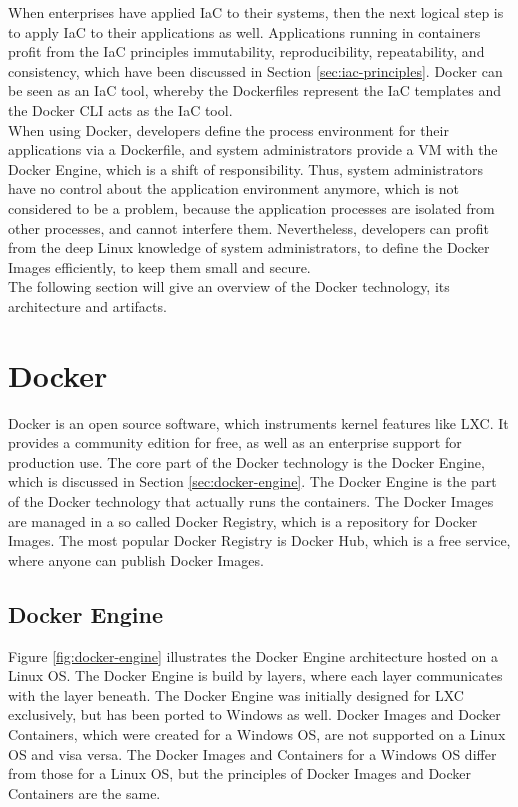 When enterprises have applied IaC to their systems, then the next logical step is to apply IaC to their applications as well. Applications running in containers profit from the IaC principles immutability, reproducibility, repeatability, and consistency, which have been discussed in Section \vref{sec:iac-principles}. Docker can be seen as an IaC tool, whereby the Dockerfiles represent the IaC templates and the Docker CLI acts as the IaC tool. \\

When using Docker, developers define the process environment for their applications via a Dockerfile, and system administrators provide a VM with the Docker Engine, which is a shift of responsibility. Thus, system administrators have no control about the application environment anymore, which is not considered to be a problem, because the application processes are isolated from other processes, and cannot interfere them. Nevertheless, developers can profit from the deep Linux knowledge of system administrators, to define the Docker Images efficiently, to keep them small and secure. \\

The following section will give an overview of the Docker technology, its architecture and artifacts.  

\section{Docker}
\label{sec:docker}
Docker is an open source software, which instruments kernel features like LXC. It provides a community edition for free, as well as an enterprise support for production use. The core part of the Docker technology is the Docker Engine, which is discussed in Section \vref{sec:docker-engine}. The Docker Engine is the part of the Docker technology that actually runs the containers. The Docker Images are managed in a so called Docker Registry, which is a repository for Docker Images. The most popular Docker Registry is Docker Hub, which is a free service, where anyone can publish Docker Images\cite{DockerRegistry2018}.

\subsection{Docker Engine}
\label{sec:docker-engine}
Figure \vref{fig:docker-engine} illustrates the Docker Engine architecture hosted on a Linux OS. The Docker Engine is build by layers, where each layer communicates with the layer beneath. The Docker Engine was initially designed for LXC exclusively, but has been ported to Windows as well. Docker Images and Docker Containers, which were created for a Windows OS, are not supported on a Linux OS and visa versa. The Docker Images and Containers for a Windows OS differ from those for a Linux OS, but the principles of Docker Images and Docker Containers are the same.
\newpage

